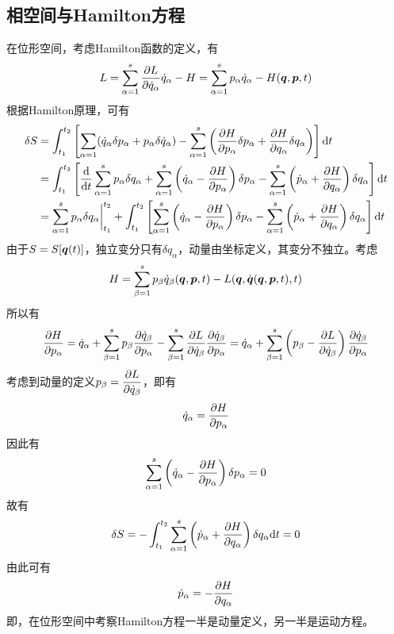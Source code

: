 \subsection{相空间与Hamilton方程}

在位形空间，考虑Hamilton函数的定义，有
\begin{equation*}
	L = \sum_{\alpha=1}^s \frac{\partial L}{\partial \dot{q}_\alpha} \dot{q}_\alpha - H = \sum_{\alpha=1}^s p_\alpha \dot{q}_\alpha - H(\boldsymbol{q},\boldsymbol{p},t)
\end{equation*}
根据Hamilton原理，可有
\begin{align*}
	\delta S & = \int_{t_1}^{t_2} \left[\sum_{\alpha=1} (\dot{q}_\alpha \delta p_\alpha + p_\alpha \delta \dot{q}_\alpha) - \sum_{\alpha=1}^s \left(\frac{\partial H}{\partial p_\alpha} \delta p_\alpha + \frac{\partial H}{\partial q_\alpha} \delta q_\alpha\right)\right] \mathrm{d} t \\
	& = \int_{t_1}^{t_2} \left[\frac{\mathrm{d}}{\mathrm{d} t} \sum_{\alpha=1}^s p_\alpha \delta q_\alpha + \sum_{\alpha=1}^s \left(\dot{q}_\alpha - \frac{\partial H}{\partial p_\alpha}\right) \delta p_\alpha - \sum_{\alpha=1}^s \left(\dot{p}_\alpha + \frac{\partial H}{\partial q_\alpha} \right) \delta q_\alpha \right] \mathrm{d} t \\
	& = \sum_{\alpha=1}^s p_\alpha \delta q_\alpha\bigg|_{t_1}^{t_2} + \int_{t_1}^{t_2} \left[\sum_{\alpha=1}^s \left(\dot{q}_\alpha - \frac{\partial H}{\partial p_\alpha}\right) \delta p_\alpha - \sum_{\alpha=1}^s \left(\dot{p}_\alpha + \frac{\partial H}{\partial q_\alpha}\right) \delta q_\alpha\right] \mathrm{d} t
\end{align*}
由于$S = S[\boldsymbol{q}(t)]$，独立变分只有$\delta q_\alpha$，动量由坐标定义，其变分不独立。考虑
\begin{equation*}
	H = \sum_{\beta=1}^s p_\beta \dot{q}_\beta(\boldsymbol{q},\boldsymbol{p},t) - L(\boldsymbol{q},\dot{\boldsymbol{q}}(\boldsymbol{q},\boldsymbol{p},t),t)
\end{equation*}
所以有
\begin{equation*}
	\frac{\partial H}{\partial p_\alpha} = \dot{q}_\alpha + \sum_{\beta=1}^s p_\beta \frac{\partial \dot{q}_\beta}{\partial p_\alpha} - \sum_{\beta=1}^s \frac{\partial L}{\partial \dot{q}_\beta} \frac{\partial \dot{q}_\beta}{\partial p_\alpha} = \dot{q}_\alpha + \sum_{\beta=1}^s \left(p_\beta - \frac{\partial L}{\partial \dot{q}_\beta} \right) \frac{\partial \dot{q}_\beta}{\partial p_\alpha}
\end{equation*}
考虑到动量的定义$p_\beta = \dfrac{\partial L}{\partial \dot{q}_\beta}$，即有
\begin{equation*}
	\dot{q}_\alpha = \frac{\partial H}{\partial p_\alpha}
\end{equation*}
因此有
\begin{equation*}
	\sum_{\alpha=1}^s \left(\dot{q}_\alpha - \frac{\partial H}{\partial p_\alpha}\right) \delta p_\alpha = 0
\end{equation*}
故有
\begin{equation*}
	\delta S = -\int_{t_1}^{t_2} \sum_{\alpha=1}^s \left(\dot{p}_\alpha + \frac{\partial H}{\partial q_\alpha} \right) \delta q_\alpha \mathrm{d} t = 0
\end{equation*}
由此可有
\begin{equation*}
	\dot{p}_\alpha = - \frac{\partial H}{\partial q_\alpha}
\end{equation*}
即，在位形空间中考察Hamilton方程一半是动量定义，另一半是运动方程。

